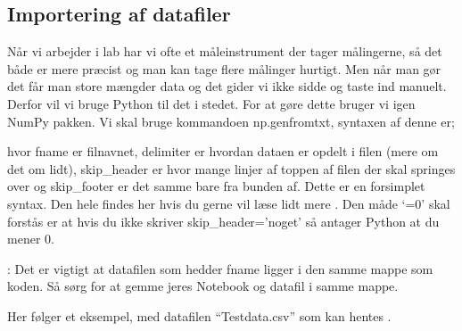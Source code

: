 \documentclass[letterpaper,10pt,english]{jupyterBook}
\begin{document}
\subsection{Importering af datafiler}
\label{\detokenize{notebooks/MekRel/Numpy:importering-af-datafiler}}
Når vi arbejder i lab har vi ofte et måleinstrument der tager målingerne, så det både er mere præcist og man kan tage flere målinger hurtigt.
Men når man gør det får man store mængder data og det gider vi ikke sidde og taste ind manuelt. Derfor vil vi bruge Python til det i stedet. For at gøre dette bruger vi igen NumPy pakken. Vi skal bruge kommandoen np.genfromtxt, syntaxen af denne er;

\begin{sphinxVerbatim}[commandchars=\\\{\}]
          
\end{sphinxVerbatim}

hvor fname er filnavnet, delimiter er hvordan dataen er opdelt i filen (mere om det om lidt), skip\_header er hvor mange linjer af toppen af filen der skal springes over og skip\_footer er det samme bare fra bunden af. Dette er en forsimplet syntax. Den hele findes her hvis du gerne vil læse lidt mere . Den måde ‘=0’ skal forstås er at hvis du ikke skriver skip\_header=’noget’ så antager Python at du mener 0.

: Det er vigtigt at datafilen som hedder fname ligger i den samme mappe som koden. Så sørg for at gemme jeres Notebook og datafil i samme mappe.

Her følger et eksempel, med datafilen “Testdata.csv” som kan hentes .

\begin{sphinxVerbatim}[commandchars=\\\{\}]
       


\end{sphinxVerbatim}
\end{document}
